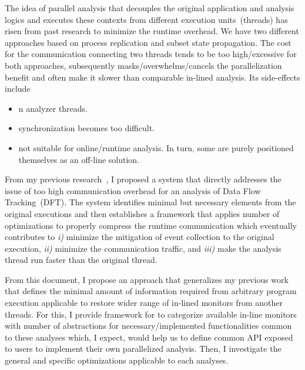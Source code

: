 The idea of parallel analysis that decouples the original application and
analysis logics and executes these contexts from different execution
units~(threads) has risen from past research to minimize the runtime overhead.  
%
We have two different approaches based on process replication and subset state
propagation.
%
The cost for the communication connecting two threads tends to be too
high/excessive for both approaches, subsequently masks/overwhelms/cancels the
parallelization benefit and often make it slower than comparable in-lined
analysis. Its side-effects include

\begin{itemize} \item n analyzer threads.  \item synchronization becomes too
difficult.  \item not suitable for online/runtime analysis. In turn, some are
purely positioned themselves as an off-line solution.  \end{itemize}

From my previous research~\cite{ShadowReplica, TFA}, I proposed a system that
directly addresses the issue of too high communication overhead for an analysis
of Data Flow Tracking~(DFT). The system identifies minimal but necessary
elements from the original executions and then establishes a framework that
applies number of optimizations to properly compress the runtime communication
which eventually contributes to {\it i)} minimize the mitigation of event
collection to the original execution, {\it ii)} minimize the communication
traffic, and {\it iii)} make the analysis thread run faster than the original
thread.

From this document, I propose an approach that generalizes my previous work
that defines the minimal amount of information required from arbitrary program
execution applicable to restore wider range of in-lined monitors from another
threads.
%
For this, I provide framework for to categorize available in-line
monitors~\cite{CAB} with number of abstractions for necessary/implemented
functionalities common to these analyses which, I expect, would help us to
define common API exposed to users to implement their own parallelized
analysis.
%
Then, I investigate the general and specific optimizations applicable to each
analyses.


